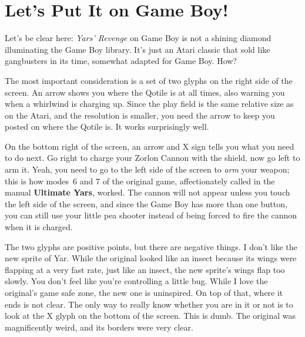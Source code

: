 \documentclass{book}
\let\oldcenter\center
\let\oldendcenter\endcenter
\renewenvironment{center}{\setlength\topsep{0pt}\oldcenter}{\oldendcenter}
\begin{document}
\FloatBarrier\needspace{10mm}\section*{Let’s Put It on Game Boy!}\nopagebreak[4]

Let’s be clear here: \emph{Yars’ Revenge} on Game Boy is not a shining diamond illuminating the Game Boy library. It’s just an Atari classic that sold like gangbusters in its time, somewhat adapted for Game Boy. How?

\begin{center}
\quad\vspace{4pt}
\quad\vspace{4pt}
\end{center}

The most important consideration is a set of two glyphs on the right side of the screen. An arrow shows you where the Qotile is at all times, also warning you when a whirlwind is charging up. Since the play field is the same relative size as on the Atari, and the resolution is smaller, you need the arrow to keep you posted on where the Qotile is. It works surprisingly well.

On the bottom right of the screen, an arrow and X sign tells you what you need to do next. Go right to charge your Zorlon Cannon with the shield, now go left to arm it. Yeah, you need to go to the left side of the screen to \emph{arm} your weapon; this is how modes~6 and 7 of the original game, affectionately called in the manual \textbf{Ultimate Yars}, worked. The cannon will not appear unless you touch the left side of the screen, and since the Game Boy has more than one button, you can still use your little pea shooter instead of being forced to fire the cannon when it is charged.

The two glyphs are positive points, but there are negative things. I don’t like the new sprite of Yar. While the original looked like an insect because its wings were flapping at a very fast rate, just like an insect, the new sprite’s wings flap too slowly. You don’t feel like you’re controlling a little bug. While I love the original’s game safe zone, the new one is uninspired. On top of that, where it ends is not clear. The only way to really know whether you are in it or not is to look at the X glyph on the bottom of the screen. This is dumb. The original was magnificently weird, and its borders were very clear.
\end{document}
